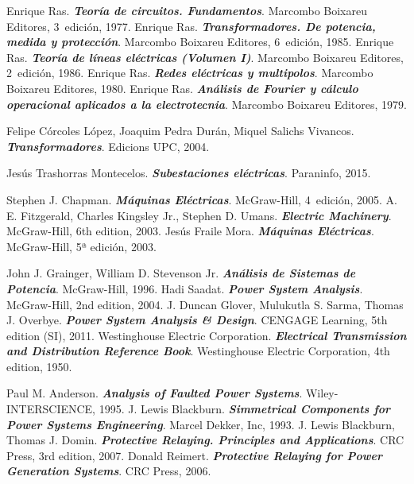 \begin{thebibliography}{99}
     Enrique Ras. \textbf{\textit{Teoría de circuitos. Fundamentos}}.  Marcombo Boixareu Editores, 3\textordfeminine\ edición, 1977.
     Enrique Ras. \textbf{\textit{Transformadores. De potencia, medida y protección}}.  Marcombo Boixareu Editores, 6\textordfeminine\ edición, 1985.
     Enrique Ras. \textbf{\textit{Teoría de líneas eléctricas (Volumen I)}}.  Marcombo Boixareu Editores, 2\textordfeminine\ edición, 1986.
     Enrique Ras. \textbf{\textit{Redes eléctricas y multipolos}}.  Marcombo Boixareu Editores, 1980.
     Enrique Ras. \textbf{\textit{Análisis de Fourier y cálculo operacional aplicados a la electrotecnia}}.  Marcombo Boixareu Editores, 1979.

     Felipe Córcoles López, Joaquim Pedra Durán, Miquel Salichs Vivancos. \textbf{\textit{Transformadores}}.  Edicions UPC, 2004.

     Jesús Trashorras Montecelos. \textbf{\textit{Subestaciones eléctricas}}.  Paraninfo, 2015.


     Stephen J. Chapman. \textbf{\textit{Máquinas Eléctricas}}.  McGraw-Hill, 4\textordfeminine\ edición, 2005.
     A. E. Fitzgerald, Charles Kingsley Jr., Stephen D. Umans. \textbf{\textit{Electric Machinery}}.  McGraw-Hill, 6th edition, 2003.
     Jesús Fraile Mora. \textbf{\textit{Máquinas Eléctricas}}.  McGraw-Hill, 5ª edición, 2003.

     John J. Grainger, William D. Stevenson Jr. \textbf{\textit{Análisis de Sistemas de Potencia}}.  McGraw-Hill, 1996.
     Hadi Saadat. \textbf{\textit{Power System Analysis}}.  McGraw-Hill, 2nd edition, 2004.
     J. Duncan Glover, Mulukutla S. Sarma, Thomas J. Overbye. \textbf{\textit{Power System Analysis \& Design}}.  CENGAGE Learning, 5th edition (SI), 2011.
     Westinghouse Electric Corporation. \textbf{\textit{Electrical Transmission and Distribution Reference Book}}.  Westinghouse Electric Corporation, 4th edition, 1950.

     Paul M. Anderson. \textbf{\textit{Analysis of Faulted Power Systems}}.  Wiley-INTERSCIENCE, 1995.
     J. Lewis Blackburn. \textbf{\textit{Simmetrical Components for Power Systems Engineering}}.  Marcel Dekker, Inc, 1993.
     J. Lewis Blackburn, Thomas J. Domin. \textbf{\textit{Protective Relaying. Principles and Applications}}.  CRC Press, 3rd edition, 2007.
     Donald Reimert. \textbf{\textit{Protective Relaying for Power Generation Systems}}.  CRC Press, 2006.



\end{thebibliography}
